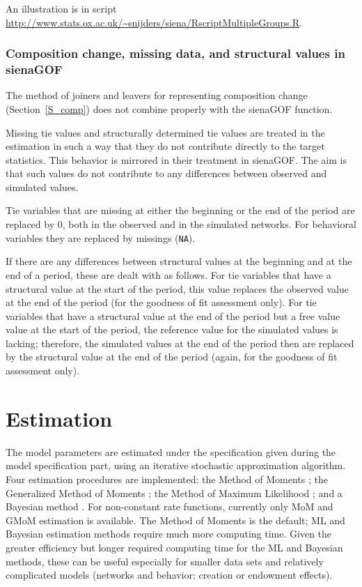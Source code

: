 \documentclass[a4paper,fleqn,11pt]{article}
\newcommand{\+}{\, + \,}
\begin{document}
An illustration is in script \\
\url{http://www.stats.ox.ac.uk/~snijders/siena/RscriptMultipleGroups.R}.



\subsubsection{Composition change, missing data, and structural values in \textsf{sienaGOF} }


The method of joiners and leavers for representing composition change
(Section~\ref{S_comp}) does not combine properly with the \textsf{sienaGOF} function.


Missing tie values and structurally determined tie values are treated
in the estimation in such a way that they do not contribute directly
to the target statistics. This behavior is mirrored in their treatment
in \textsf{sienaGOF}. The aim is that such values do not contribute
to any differences between observed and simulated values.

Tie variables that are missing at either the beginning or the end of the period
are replaced by 0, both in the observed and in the simulated networks.
For behavioral variables they are replaced by missings (\texttt{NA}).

If there are any differences between structural values at the beginning and
at the end of a period, these are dealt with as follows.
For tie variables that have a structural value at the start of the period,
this value replaces the observed value at the end of the period
(for the goodness of fit assessment only).
For tie variables that have a structural value at the end of the period
but a free value value at the start of the period, the reference value for
the simulated values is lacking; therefore, the simulated values at the end
of the period then are replaced by the structural value at the end of the period
(again, for the goodness of fit assessment only).


\newpage

\section{Estimation}
\label{S_Est}

The model parameters are estimated under the specification given
during the model specification part, using an iterative stochastic
approximation algorithm.
Four estimation procedures are implemented:
the Method of Moments \citep*[`MoM';][]{Snijders01, SnijdersEA07};
the Generalized Method of Moments \citep*[`GMoM';][]{ASS2015,ASS2019};
 the Method of Maximum Likelihood \citep[`ML';][]{SnijdersEA10a};
 and a Bayesian method
 \citep{Koskinen04, KoskinenSnijders07,SchweinbergerSnijders07c}.
 For non-constant rate functions, currently only
 MoM and GMoM estimation is available.
 The Method of Moments is the default;
 ML and Bayesian estimation methods require much more computing time.
 Given the greater efficiency but longer required computing time
 for the ML and Bayesian methods,
 these can be useful especially for smaller data sets
 and relatively complicated models
 (networks and behavior; creation or endowment effects).
\end{document}
